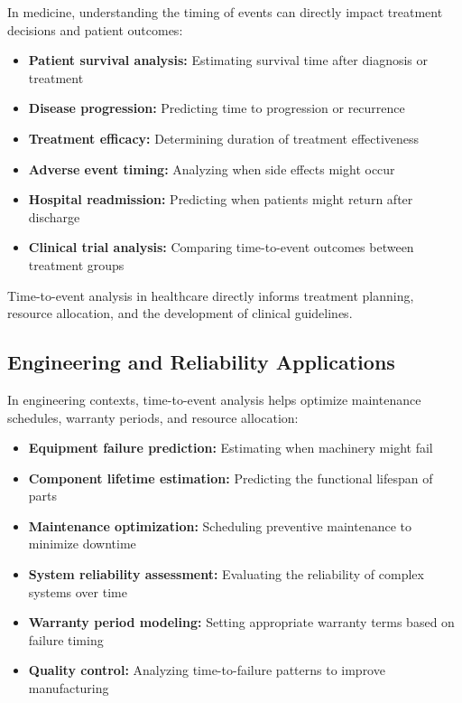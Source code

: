 In medicine, understanding the timing of events can directly impact treatment decisions and patient outcomes:

\begin{itemize}
\item \textbf{Patient survival analysis:} Estimating survival time after diagnosis or treatment
\item \textbf{Disease progression:} Predicting time to progression or recurrence
\item \textbf{Treatment efficacy:} Determining duration of treatment effectiveness
\item \textbf{Adverse event timing:} Analyzing when side effects might occur
\item \textbf{Hospital readmission:} Predicting when patients might return after discharge
\item \textbf{Clinical trial analysis:} Comparing time-to-event outcomes between treatment groups
\end{itemize}

Time-to-event analysis in healthcare directly informs treatment planning, resource allocation, and the development of clinical guidelines.

\subsection{Engineering and Reliability Applications}

In engineering contexts, time-to-event analysis helps optimize maintenance schedules, warranty periods, and resource allocation:

\begin{itemize}
\item \textbf{Equipment failure prediction:} Estimating when machinery might fail
\item \textbf{Component lifetime estimation:} Predicting the functional lifespan of parts
\item \textbf{Maintenance optimization:} Scheduling preventive maintenance to minimize downtime
\item \textbf{System reliability assessment:} Evaluating the reliability of complex systems over time
\item \textbf{Warranty period modeling:} Setting appropriate warranty terms based on failure timing
\item \textbf{Quality control:} Analyzing time-to-failure patterns to improve manufacturing
\end{itemize}

